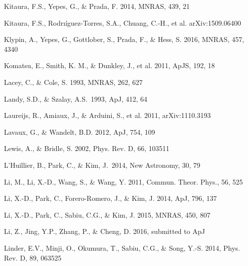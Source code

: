 \documentclass[iop]{emulateapj}
\begin{document}
\begin{thebibliography}{}
Kitaura, F.S., Yepes, G., \& Prada, F. 2014, MNRAS, 439, 21 

Kitaura, F.S., Rodrı\'{i}guez-Torres, S.A., Chuang, C.-H., et al. arXiv:1509.06400

Klypin, A., Yepes, G., Gottlober, S., Prada, F., \& Hess, S. 2016,
MNRAS, 457, 4340%

Komatsu, E., Smith, K. M., \& Dunkley, J., et al. 2011, ApJS, 192, 18  

Lacey, C., \& Cole, S. 1993, MNRAS, 262, 627


Landy, S.D., \& Szalay, A.S.\ 1993, ApJ, 412, 64 

Laureijs, R., Amiaux, J., \& Arduini, S., et al. 2011, arXiv:1110.3193

Lavaux, G., \& Wandelt, B.D. 2012, ApJ, 754, 109  


Lewis, A., \& Bridle, S. 2002, Phys. Rev. D, 66, 103511

L'Huillier, B., Park, C., \& Kim, J.\ 2014, New Astronomy, 30, 79 

Li, M., Li, X.-D., Wang, S., \& Wang, Y. 2011, Commun. Theor. Phys., 56, 525

Li, X.-D., Park, C., Forero-Romero, J., \& Kim, J. 2014, ApJ, 796, 137

Li, X.-D., Park, C., Sabiu, C.G., \& Kim, J. 2015, MNRAS, 450, 807 

Li, Z., Jing, Y.P., Zhang, P., \& Cheng, D. 2016, submitted to ApJ 


Linder, E.V., Minji, O., Okumura, T., Sabiu, C.G., \& Song, Y.-S. 2014, Phys. Rev. D, 89, 063525  


\end{thebibliography}
\end{document}
